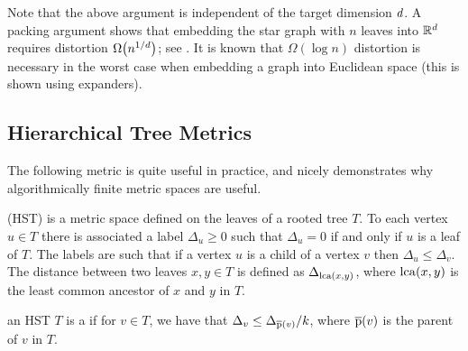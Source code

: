 Note that the above argument is independent of the target dimension
$d$. A packing argument shows that embedding the star graph with
$n$ leaves into $\mathbb{R}^d$ requires distortion
$\Omega\pth{n^{1/\hdim}}$; see .  It is known
that $\Omega(\log n)$ distortion is necessary in the worst case when
embedding a graph into Euclidean space (this is shown using
expanders).  

\subsection{Hierarchical Tree Metrics}

The following metric is quite useful in practice, and nicely
demonstrates why algorithmically finite metric spaces are useful.
\begin{defn}
     (HST) is a metric space
    defined on the leaves of a rooted tree $T$. To each vertex $u\in
    T$ there is associated a label $\Delta_u \ge 0$ such that
    $\Delta_u=0$ if and only if $u$ is a leaf of $T$.  The labels are
    such that if a vertex $u$ is a child of a vertex $v$ then
    $\Delta_u\leq \Delta_v$. The distance between two leaves $x,y\in
    T$ is defined as $\Delta_{\operatorname{lca}(x,y)}$, where $\operatorname{lca}(x,y)$ is the
    least common ancestor of $x$ and $y$ in $T$.
    
    an HST $T$ is a  if for  $v \in T$, we have
    that $\Delta_v \leq \Delta_{\overline{\mathrm{p}}(v)}/k$, where $\overline{\mathrm{p}}(v)$ is
    the parent of $v$ in $T$.

\end{defn}

